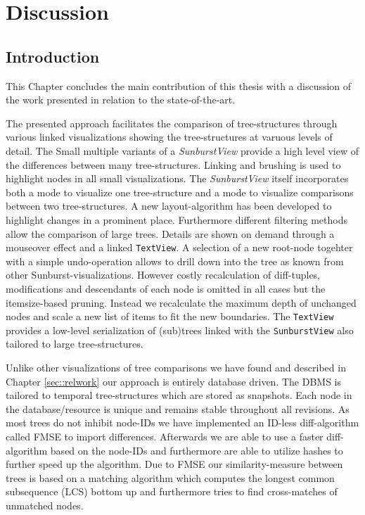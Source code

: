 \section{Discussion}\label{sec::discussion}
\subsection{Introduction}
This Chapter concludes the main contribution of this thesis with a discussion of the work presented in relation to the state-of-the-art.

The presented approach facilitates the comparison of tree-structures through various linked visualizations showing the tree-structures at varuous levels of detail. The Small multiple variants of a \emph{SunburstView} provide a high level view of the differences between many tree-structures. Linking and brushing is used to highlight nodes in all small visualizations. The \emph{SunburstView} itself incorporates both a mode to visualize one tree-structure and a mode to visualize comparisons between two tree-structures. A new layout-algorithm has been developed to highlight changes in a prominent place. Furthermore different filtering methods allow the comparison of large trees. Details are shown on demand through a mouseover effect and a linked \texttt{TextView}. A selection of a new root-node togehter with a simple undo-operation allows to drill down into the tree as known from other Sunburst-visualizations. However costly recalculation of diff-tuples, modifications and descendants of each node is omitted in all cases but the itemsize-based pruning. Instead we recalculate the maximum depth of unchanged nodes and scale a new list of items to fit the new boundaries. The \texttt{TextView} provides a low-level serialization of (sub)trees linked with the \texttt{SunburstView} also tailored to large tree-structures.

Unlike other visualizations of tree comparisons we have found and described in Chapter \ref{sec::relwork} our approach is entirely database driven. The DBMS is tailored to temporal tree-structures which are stored as snapshots. Each node in the database/resource is unique and remains stable throughout all revisions. As most trees do not inhibit node-IDs we have implemented an ID-less diff-algorithm called FMSE to import differences. Afterwards we are able to use a faster diff-algorithm based on the node-IDs and furthermore are able to utilize hashes to further speed up the algorithm. Due to FMSE our similarity-measure between trees is based on a matching algorithm which computes the longest common subsequence (LCS) bottom up and furthermore tries to find cross-matches of unmatched nodes.

